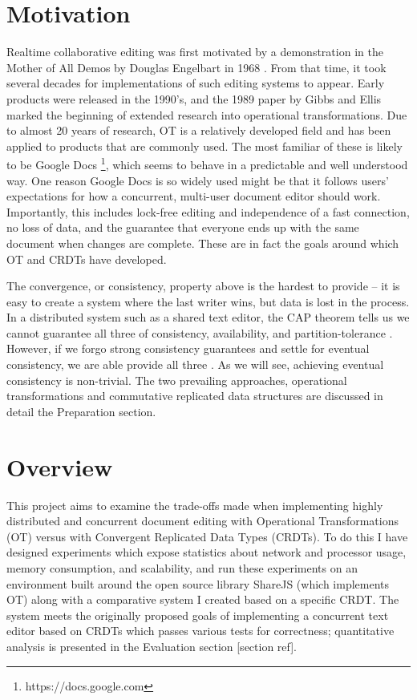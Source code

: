 \documentclass[12pt,a4paper,twoside,openright]{report}
\begin{document}
\section{Motivation}

Realtime collaborative editing was first motivated by a demonstration in the Mother of All Demos by Douglas Engelbart in 1968 \cite{MotherDemo}. From that time, it took several decades for implementations of such editing systems to appear. Early products were released in the 1990's, and the 1989 paper by Gibbs and Ellis \cite{Ellis1989} marked the beginning of extended research into operational transformations. Due to almost 20 years of research, OT is a relatively developed field and has been applied to products that are commonly used. The most familiar of these is likely to be Google Docs \footnote{https://docs.google.com}, which seems to behave in a predictable and well understood way. One reason Google Docs is so widely used might be that it follows users' expectations for how a concurrent, multi-user document editor should work. Importantly, this includes lock-free editing and independence of a fast connection, no loss of data, and the guarantee that everyone ends up with the same document when changes are complete. These are in fact the goals around which OT and CRDTs have developed.

The convergence, or consistency, property above is the hardest to provide -- it is easy to create a system where the last writer wins, but data is lost in the process. In a distributed system such as a shared text editor, the CAP theorem tells us we cannot guarantee all three of consistency, availability, and partition-tolerance \cite{Gilbert2005}. However, if we forgo strong consistency guarantees and settle for eventual consistency, we are able provide all three \cite{zeller2014}. As we will see, achieving eventual consistency is non-trivial. The two prevailing approaches, operational transformations and commutative replicated data structures are discussed in detail the Preparation section.


\section{Overview}
This project aims to examine the trade-offs made when implementing highly distributed and concurrent document editing with Operational Transformations (OT) versus with Convergent Replicated Data Types (CRDTs). To do this I have designed experiments which expose statistics about network and processor usage, memory consumption, and scalability, and run these experiments on an environment built around the open source library ShareJS (which implements OT) along with a comparative system I created based on a specific CRDT. The system meets the originally proposed goals of implementing a concurrent text editor based on CRDTs which passes various tests for correctness; quantitative analysis is presented in the Evaluation section [section ref].
\end{document}
